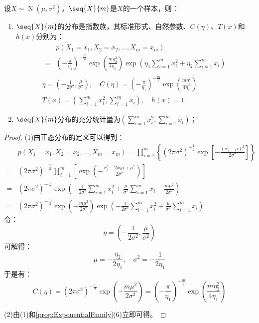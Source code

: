\begin{theorem}
	设$X\sim\operatorname{N}(\mu,\sigma^2)$，$\seq{X}{m}$是$X$的一个样本，则：
	\begin{enumerate}
		\item $\seq{X}{m}$的分布是指数族，其标准形式、自然参数、$C(\eta)$、$T(x)$和$h(x)$分别为：
		\begin{gather*}
			\begin{aligned}
				&p(X_1=x_1,X_2=x_2,\dots,X_m=x_m) \\
				=&\left(-\frac{\pi}{\eta_1}\right)^{-\frac{m}{2}}\exp\left(\frac{m\eta_2^2}{4\eta_1}\right)\exp\left(\eta_1\sum_{i=1}^{m}x_i^2+\eta_2\sum_{i=1}^{m}x_i\right)
			\end{aligned} \\
			\eta=\left(-\frac{1}{2\sigma^2},\frac{\mu}{\sigma^2}\right),\quad C(\eta)=\left(-\frac{\pi}{\eta_1}\right)^{-\frac{m}{2}}\exp\left(\frac{m\eta_2^2}{4\eta_1}\right) \\
			T(x)=\left(\sum_{i=1}^{m}x_i^2,\sum_{i=1}^{m}x_i\right),\quad h(x)=1
		\end{gather*}
		\item $\seq{X}{m}$分布的充分统计量为$\left(\sum\limits_{i=1}^{m}x_i^2,\sum\limits_{i=1}^{m}x_i\right)$；
	\end{enumerate}
\end{theorem}
\begin{proof}
	(1)由正态分布的定义可以得到：
	\begin{align*}
		&p(X_1=x_1,X_2=x_2,\dots,X_m=x_m)=\prod_{i=1}^{m}\left\{(2\pi\sigma^2)^{-\frac{1}{2}}\exp\left[-\frac{(x_i-\mu)^2}{2\sigma^2}\right]\right\} \\
		=&(2\pi\sigma^2)^{-\frac{m}{2}}\prod_{i=1}^{m}\left[\exp\left(-\frac{x_i^2-2x_i\mu+\mu^2}{2\sigma^2}\right)\right] \\
		=&(2\pi\sigma^2)^{-\frac{m}{2}}\exp\left(-\frac{1}{2\sigma^2}\sum_{i=1}^{m}x_i^2+\frac{\mu}{\sigma^2}\sum_{i=1}^{m}x_i-\frac{m\mu^2}{2\sigma^2}\right) \\
		=&(2\pi\sigma^2)^{-\frac{m}{2}}\exp\left(-\frac{m\mu^2}{2\sigma^2}\right)\exp\left(-\frac{1}{2\sigma^2}\sum_{i=1}^{m}x_i^2+\frac{\mu}{\sigma^2}\sum_{i=1}^{m}x_i\right)
	\end{align*}
	令：
	\begin{equation*}
		\eta=\left(-\frac{1}{2\sigma^2},\frac{\mu}{\sigma^2}\right)
	\end{equation*}
	可解得：
	\begin{equation*}
		\mu=-\frac{\eta_2}{2\eta_1},\quad\sigma^2=-\frac{1}{2\eta_1}
	\end{equation*}
	于是有：
	\begin{equation*}
		C(\eta)=(2\pi\sigma^2)^{-\frac{m}{2}}\exp\left(-\frac{m\mu^2}{2\sigma^2}\right)=\left(-\frac{\pi}{\eta_1}\right)^{-\frac{m}{2}}\exp\left(\frac{m\eta_2^2}{4\eta_1}\right)
	\end{equation*}\par
	(2)由(1)和\cref{prop:ExponentialFamily}(6)立即可得。
\end{proof}

